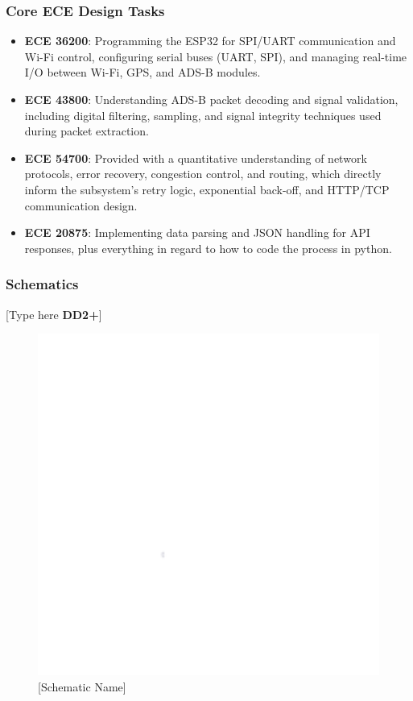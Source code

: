 \subsubsection{Core ECE Design Tasks}
\begin{itemize}
    \item \textbf{ECE 36200}: Programming the ESP32 for SPI/UART communication and Wi-Fi control, configuring serial buses (UART, SPI), and managing real-time I/O between Wi-Fi, GPS, and ADS-B modules.
    \item \textbf{ECE 43800}: Understanding ADS-B packet decoding and signal validation, including digital filtering, sampling, and signal integrity techniques used during packet extraction.
    \item \textbf{ECE 54700}: Provided with a quantitative understanding of network protocols, error recovery, congestion control, and routing, which directly inform the subsystem’s retry logic, exponential back-off, and HTTP/TCP communication design.
    \item \textbf{ECE 20875}: Implementing data parsing and JSON handling for API responses, plus everything in regard to how to code the process in python.
\end{itemize}

\subsubsection{Schematics}
[Type here \textbf{DD2+}]
\begin{figure}[h]
    \centering
    \includegraphics[width=16cm]{images/white.png} %
    \caption{[Schematic Name]}
\end{figure} %

